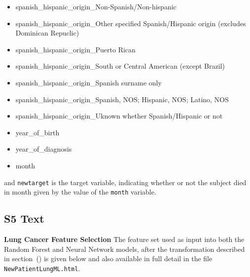 \documentclass[10pt,letterpaper]{article}
\newcommand{\codewhite}[1]{\colorbox{white}{\texttt{#1}}}
\begin{document}
\begin{itemize}[noitemsep]
\item spanish\_hispanic\_origin\_Non-Spanish/Non-hispanic
\item spanish\_hispanic\_origin\_Other specified Spanish/Hispanic origin (excludes Dominican Repuclic)
\item spanish\_hispanic\_origin\_Puerto Rican
\item spanish\_hispanic\_origin\_South or Central American (except Brazil)
\item spanish\_hispanic\_origin\_Spanish surname only
\item spanish\_hispanic\_origin\_Spanish, NOS; Hispanic, NOS; Latino, NOS
\item spanish\_hispanic\_origin\_Uknown whether Spanish/Hispanic or not
\item year\_of\_birth
\item year\_of\_diagnosis
\item month
\end{itemize}


and 
\codewhite{newtarget} is the target variable, indicating whether or not the subject died in month given by the value of the \codewhite{month} variable.






\subsection*{S5 Text}
\label{S5_Text}

{\bf Lung Cancer Feature Selection} The feature set used as input into both the Random Forest and Neural Network models, after the transformation described in section~() is given below and also available in full detail in the file 
\codewhite{NewPatientLungML.html}.
\end{document}
